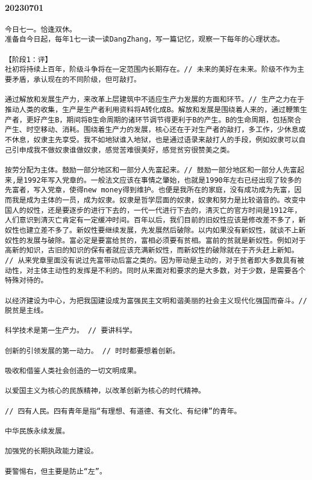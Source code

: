 \documentclass[UTF8]{Diaries}
\begin{document}
\paragraph{20230701}
\begin{lstlisting}
今日七一。恰逢双休。
准备自今日起，每年1七一读一读DangZhang，写一篇记忆，观察一下每年的心理状态。

【阶段1：评】
社初将持续上百年，阶级斗争将在一定范围内长期存在。// 未来的美好在未来。阶级不作为主要矛盾，承认现在的不同阶级，但可敲打。

通过解放和发展生产力，来改革上层建筑中不适应生产力发展的方面和环节。// 生产之力在于推动人类的收集，生产是生产者利用资料将A转化成B。解放和发展是围绕着人来的，通过鞭策生产者，更好产生B，期间将B生命周期的诸环节调节得更利于B的产生。B的生命周期，包括聚合产生、时空移动、消耗。围绕着生产力的发展，核心还在于对生产者的敲打，多工作，少休息或不休息，奴隶主先享受。我不如地狱谁入地狱，也是通过语录来敲打人的手段，例如奴隶可以自己引申成我不做奴隶谁做奴隶，感觉苦难很美好，感觉贫穷很赞美之类。

按劳分配为主体。鼓励一部分地区和一部分人先富起来。// 鼓励一部分地区和一部分人先富起来,是1992年写入党章的。一般法文应该在事情之肇始，也就是1990年左右已经出现了较多的先富者，写入党章，使得new money得到维护。也便是我所在的家庭，没有成功成为先富，因而我是成为主体的一员，成为奴隶。奴隶是哲学层面的奴隶，奴隶和努力是比较谐音的。改变中国人的奴性，还是要逐步的进行下去的，一代一代进行下去的，清灭亡的官方时间是1912年，人们意识到清灭亡肯定有一定缓冲时间。百年以后，我们目前的旧奴性应该是修改差不多了，新奴性也建立差不多了。新奴性要继续发展，先发展然后破除。以内如果没有新奴性，就谈不上新奴性的发展与破除。富必定是要富给贫的，富相必须要有贫相。富前的贫就是新奴性。例如对于高新的知识，古旧的知识的保有者就应该充满新奴性，而新奴性的破除就在于齐头赶上新知。
// 从来党章里面没有说过先富带动后富之类的。因为带动是主动的，对于贫者即大多数具有被动性，对主体主动性的发挥是不利的。同时从来面对和要求的是大多数，对于少数，是需要各个特殊对待的。

以经济建设为中心，为把我国建设成为富强民主文明和谐美丽的社会主义现代化强国而奋斗。// 脱贫是主线。

科学技术是第一生产力。 // 要讲科学。

创新的引领发展的第一动力。 // 时时都要想着创新。

吸收和借鉴人类社会创造的一切文明成果。

以爱国主义为核心的民族精神，以改革创新为核心的时代精神。

// 四有人民。四有青年是指“有理想、有道德、有文化、有纪律”的青年。

中华民族永续发展。

加强党的长期执政能力建设。

要警惕右，但主要是防止“左”。

\end{lstlisting}
\end{document}
